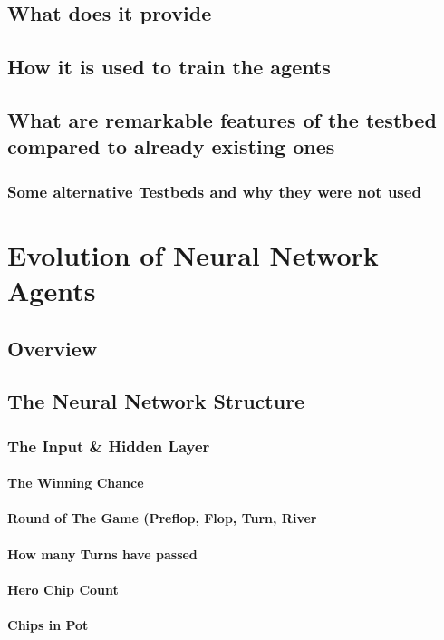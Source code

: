 \section{What does it provide}
\section{How it is used to train the agents}
\section{What are remarkable features of the testbed compared to already existing ones}
\subsection{Some alternative Testbeds and why they were not used}

\chapter{Evolution of Neural Network Agents}
\section{Overview}
\section{The Neural Network Structure}
\subsection{The Input \& Hidden Layer}
\subsubsection{The Winning Chance}
\subsubsection{Round of The Game (Preflop, Flop, Turn, River}
\subsubsection{How many Turns have passed}
\subsubsection{Hero Chip Count}
\subsubsection{Chips in Pot}
